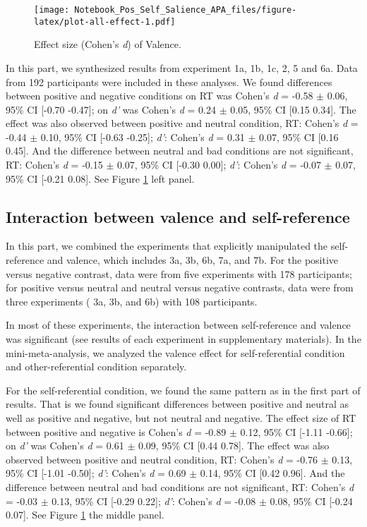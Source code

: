 \documentclass[
  english,
  man]{apa6}
\begin{document}
\begin{figure}
\centering
\texttt{[image: Notebook\_Pos\_Self\_Salience\_APA\_files/figure-latex/plot-all-effect-1.pdf]}
\caption{\label{fig:plot-all-effect}Effect size (Cohen's \emph{d}) of Valence.}
\end{figure}

In this part, we synthesized results from experiment 1a, 1b, 1c, 2, 5 and 6a. Data from 192 participants were included in these analyses. We found differences between positive and negative conditions on RT was Cohen's \emph{d} = -0.58 \(\pm\) 0.06, 95\% CI {[}-0.70 -0.47{]}; on \emph{d'} was Cohen's \emph{d} = 0.24 \(\pm\) 0.05, 95\% CI {[}0.15 0.34{]}. The effect was also observed between positive and neutral condition, RT: Cohen's \emph{d} = -0.44 \(\pm\) 0.10, 95\% CI {[}-0.63 -0.25{]}; \emph{d'}: Cohen's \emph{d} = 0.31 \(\pm\) 0.07, 95\% CI {[}0.16 0.45{]}. And the difference between neutral and bad conditions are not significant, RT: Cohen's \emph{d} = -0.15 \(\pm\) 0.07, 95\% CI {[}-0.30 0.00{]}; \emph{d'}: Cohen's \emph{d} = -0.07 \(\pm\) 0.07, 95\% CI {[}-0.21 0.08{]}. See Figure \ref{fig:plot-all-effect} left panel.

\hypertarget{interaction-between-valence-and-self-reference}{%
\subsection{Interaction between valence and self-reference}\label{interaction-between-valence-and-self-reference}}

In this part, we combined the experiments that explicitly manipulated the self-reference and valence, which includes 3a, 3b, 6b, 7a, and 7b. For the positive versus negative contrast, data were from five experiments with 178 participants; for positive versus neutral and neutral versus negative contrasts, data were from three experiments ( 3a, 3b, and 6b) with 108 participants.

In most of these experiments, the interaction between self-reference and valence was significant (see results of each experiment in supplementary materials). In the mini-meta-analysis, we analyzed the valence effect for self-referential condition and other-referential condition separately.

For the self-referential condition, we found the same pattern as in the first part of results. That is we found significant differences between positive and neutral as well as positive and negative, but not neutral and negative. The effect size of RT between positive and negative is Cohen's \emph{d} = -0.89 \(\pm\) 0.12, 95\% CI {[}-1.11 -0.66{]}; on \emph{d'} was Cohen's \emph{d} = 0.61 \(\pm\) 0.09, 95\% CI {[}0.44 0.78{]}. The effect was also observed between positive and neutral condition, RT: Cohen's \emph{d} = -0.76 \(\pm\) 0.13, 95\% CI {[}-1.01 -0.50{]}; \emph{d'}: Cohen's \emph{d} = 0.69 \(\pm\) 0.14, 95\% CI {[}0.42 0.96{]}. And the difference between neutral and bad conditions are not significant, RT: Cohen's \emph{d} = -0.03 \(\pm\) 0.13, 95\% CI {[}-0.29 0.22{]}; \emph{d'}: Cohen's \emph{d} = -0.08 \(\pm\) 0.08, 95\% CI {[}-0.24 0.07{]}. See Figure \ref{fig:plot-all-effect} the middle panel.
\end{document}
